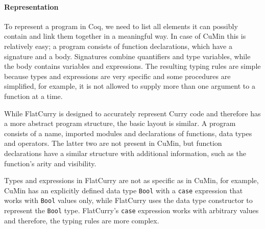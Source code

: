 \documentclass[paper = a4, fleqn, twoside]{scrreprt}
\begin{document}
\paragraph{Representation}
To represent a program in Coq, we need to list all elements it can possibly contain and link them together in a meaningful way. In case of CuMin this is relatively easy; a program consists of function declarations, which have a signature and a body. Signatures combine quantifiers and type variables, while the body contains variables and expressions. The resulting typing rules are simple because types and expressions are very specific and some procedures are simplified, for example, it is not allowed to supply more than one argument to a function at a time. 
\par
While FlatCurry is designed to accurately represent Curry code and therefore has a more abstract program structure, the basic layout is similar. A program consists of a name, imported modules and declarations of functions, data types and operators. The latter two are not present in CuMin, but function declarations have a similar structure with additional information, such as the function's arity and visibility.
\par
Types and expressions in FlatCurry are not as specific as in CuMin, for example, CuMin has an explicitly defined data type \texttt{Bool} with a \texttt{case} expression that works with \texttt{Bool} values only, while FlatCurry uses the data type constructor to represent the \texttt{Bool} type. FlatCurry's \texttt{case} expression works with arbitrary values and therefore, the typing rules are more complex.\\
\end{document}
